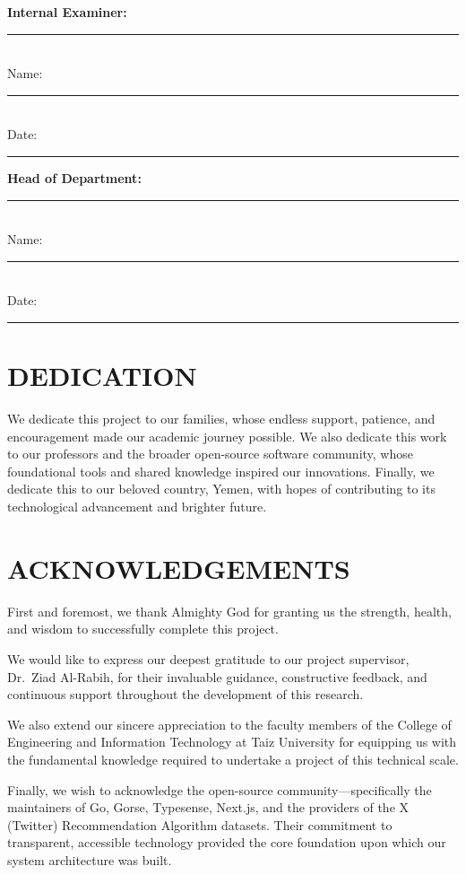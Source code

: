 \documentclass[12pt,a4paper]{report}
\begin{document}
\vspace{0.75cm}

\noindent\textbf{Internal Examiner:}\\
\noindent\rule{8cm}{0.4pt}\\
Name: \rule{5cm}{0.4pt}\\
Date: \rule{4cm}{0.4pt}

\vspace{0.75cm}

\noindent\textbf{Head of Department:}\\
\noindent\rule{8cm}{0.4pt}\\
Name: \rule{5cm}{0.4pt}\\
Date: \rule{4cm}{0.4pt}

\chapter*{DEDICATION}

We dedicate this project to our families, whose endless support, patience, and encouragement made our academic journey possible. We also dedicate this work to our professors and the broader open-source software community, whose foundational tools and shared knowledge inspired our innovations. Finally, we dedicate this to our beloved country, Yemen, with hopes of contributing to its technological advancement and brighter future.

\chapter*{ACKNOWLEDGEMENTS}

First and foremost, we thank Almighty God for granting us the strength, health, and wisdom to successfully complete this project.

We would like to express our deepest gratitude to our project supervisor, Dr.\ Ziad Al-Rabih, for their invaluable guidance, constructive feedback, and continuous support throughout the development of this research.

We also extend our sincere appreciation to the faculty members of the College of Engineering and Information Technology at Taiz University for equipping us with the fundamental knowledge required to undertake a project of this technical scale.

Finally, we wish to acknowledge the open-source community---specifically the maintainers of Go, Gorse, Typesense, Next.js, and the providers of the X (Twitter) Recommendation Algorithm datasets. Their commitment to transparent, accessible technology provided the core foundation upon which our system architecture was built.
\end{document}
